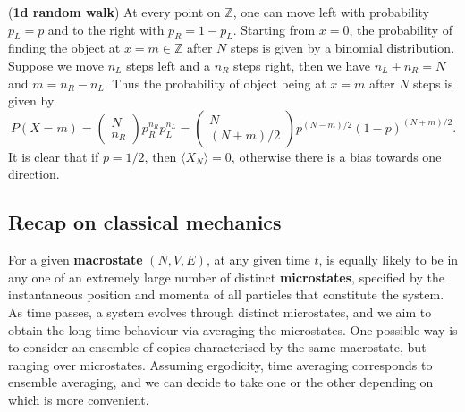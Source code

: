 \documentclass[letter-paper]{tufte-book}
\newenvironment{example}[1][Example]{\begin{trivlist}
\item[\hskip \labelsep {\bfseries #1}]}{\end{trivlist}}
\newcommand\Def[1]{\textbf{#1}}
\begin{document}
\begin{example}
(\textbf{1d random walk}) At every point on $\mathbb{Z}$, one can move left with
probability $p_L = p$ and to the right with $p_R = 1 - p_L$. Starting from
$x=0$, the probability of finding the object at $x=m\in \mathbb{Z}$ after $N$
steps is given by a binomial distribution. Suppose we move $n_L$ steps left and
a $n_R$ steps right, then we have $n_L + n_R = N$ and $m = n_R - n_L$. Thus the probability of object being at $x=m$ after $N$ steps is given by
\begin{equation*}
  P(X = m) = \begin{pmatrix}N \\ n_R\end{pmatrix} p_R^{n_R} p_L^{n_L} = \begin{pmatrix}N \\ (N+m)/2\end{pmatrix} p^{(N-m)/2} (1-p)^{(N+m)/2}.
\end{equation*}
It is clear that if $p=1/2$, then $\langle X_N\rangle = 0$, otherwise there is a
bias towards one direction.
\end{example}


\subsection{Recap on classical mechanics}

For a given \Def{macrostate} $(N, V, E)$, at any given time $t$, is equally
likely to be in any one of an extremely large number of distinct
\Def{microstates}, specified by the instantaneous position and momenta of all
particles that constitute the system. As time passes, a system evolves through
distinct microstates, and we aim to obtain the long time behaviour via averaging
the microstates. One possible way is to consider an ensemble of copies
characterised by the same macrostate, but ranging over microstates. Assuming
ergodicity, time averaging corresponds to ensemble averaging, and we can decide
to take one or the other depending on which is more convenient.
\end{document}
